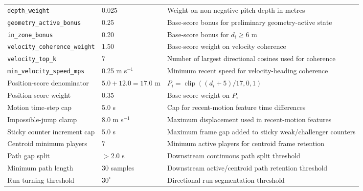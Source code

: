 \begin{table}[tbp]
\begin{tabular}{lll}
\texttt{depth\_weight} & 0.025 & Weight on non-negative pitch depth in metres \\
\texttt{geometry\_active\_bonus} & 0.25 & Base-score bonus for preliminary geometry-active state \\
\texttt{in\_zone\_bonus} & 0.20 & Base-score bonus for \(d_i\ge6\) m \\
\texttt{velocity\_coherence\_weight} & 1.50 & Base-score weight on velocity coherence \\
\texttt{velocity\_top\_k} & 7 & Number of largest directional cosines used for coherence \\
\texttt{min\_velocity\_speed\_mps} & 0.25 m s\(^{-1}\) & Minimum recent speed for velocity-heading coherence \\
Position-score denominator & \(5.0+12.0=17.0\) m & \(P_i=\operatorname{clip}((d_i+5)/17,0,1)\) \\
Position-score weight & 0.35 & Base-score weight on \(P_i\) \\
Motion time-step cap & 5.0 s & Cap for recent-motion feature time differences \\
Impossible-jump clamp & 8.0 m s\(^{-1}\) & Maximum displacement used in recent-motion features \\
Sticky counter increment cap & 5.0 s & Maximum frame gap added to sticky weak/challenger counters \\
Centroid minimum players & 7 & Minimum active players for centroid frame retention \\
Path gap split & \(>2.0\) s & Downstream continuous path split threshold \\
Minimum path length & 30 samples & Downstream active/centroid path retention threshold \\
Run turning threshold & \(30^\circ\) & Directional-run segmentation threshold \\
\hline
\end{tabular}
\end{table}
